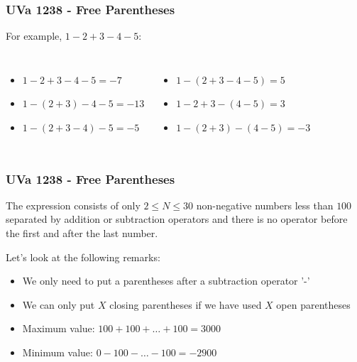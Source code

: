 \documentclass{beamer}
\begin{document}
\begin{frame}[fragile]
\frametitle{UVa 1238 - Free Parentheses}

For example, $1 - 2 + 3 - 4 - 5$: 
\begin{columns}

\begin{itemize}
    \item $1 - 2 + 3 - 4 - 5 = -7$
    \item $1 - (2 + 3) - 4 - 5 = -13$
    \item $1-(2+3-4)-5 = -5$
\end{itemize}


\begin{itemize}
    \item $1 - (2 + 3 - 4 - 5) = 5$
    \item $1 - 2 + 3 - (4 - 5) = 3$
    \item $1-(2+3)-(4-5)= -3$
\end{itemize}

\end{columns}

\end{frame}

\begin{frame}[fragile]
\frametitle{UVa 1238 - Free Parentheses}

The expression consists of only $2 \leq N \leq 30$ non-negative numbers less than $100$ separated by addition or subtraction operators and there is no operator before the first and after the last number.

\vspace{0.3cm}

Let's look at the following remarks:

\begin{itemize}
    \item We only need to put a parentheses after a subtraction operator '-'
    \item We can only put $X$ closing parentheses if we have used $X$ open parentheses
    \item Maximum value: $100 + 100 + \ldots + 100 = 3000$
    \item Minimum value: $0 - 100 - \ldots - 100 = -2900$
\end{itemize}

\end{frame}
\end{document}
